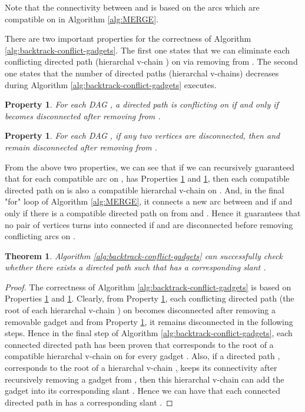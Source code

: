 \documentclass[11pt]{article}
\newtheorem{theorem}[figure]{Theorem}
\newtheorem{property}[figure]{Property}
\begin{document}
Note that the connectivity between  and  is based on the arcs
which are compatible on 
in Algorithm \ref{alg:MERGE}.


There are two important properties for the correctness of Algorithm \ref{alg:backtrack-conflict-gadgets}.
The first one states that
we can eliminate each conflicting directed path  (hierarchal v-chain ) on  via removing  from .
The second one states that
the number of directed paths (hierarchal v-chains) decreases
during Algorithm \ref{alg:backtrack-conflict-gadgets} executes.

\begin{property}\label{prop:connected-v-chain}
For each DAG ,
a directed path 
is conflicting on  if and only if  becomes disconnected after removing  from .
\end{property}

\begin{property}\label{prop:dummy-v-chain}
For each DAG ,
if any two vertices  are
disconnected, then  and  remain disconnected
after removing  from .
\end{property}

From the above two properties, we can see that
if we can recursively guaranteed that
for each compatible arc  on , 
has Properties \ref{prop:connected-v-chain} and \ref{prop:dummy-v-chain},
then each compatible directed path  on 
is also a compatible hierarchal v-chain on .
And, in the final "for" loop of Algorithm \ref{alg:MERGE},
it connects a new arc between  and 
if and only if there is a compatible directed path on  from  and .
Hence
it guarantees that no pair of vertices  turns into connected if
 and  are disconnected
before removing conflicting arcs on .

\begin{theorem}\label{thm:backtracking}
Algorithm \ref{alg:backtrack-conflict-gadgets} can successfully
check whether there exists a directed path 
such that  has a corresponding slant .
\end{theorem}

\begin{proof}

The correctness of Algorithm \ref{alg:backtrack-conflict-gadgets}
is based on Properties \ref{prop:connected-v-chain} and
\ref{prop:dummy-v-chain}.
Clearly, from Property \ref{prop:connected-v-chain},
each conflicting directed path 
(the root  of each hierarchal v-chain ) on 
becomes disconnected after removing a removable gadget 
and from Property \ref{prop:dummy-v-chain},
it remains disconnected in the following steps.
Hence in the final step of Algorithm \ref{alg:backtrack-conflict-gadgets},
each connected directed path  has been proven that
 corresponds to the root  of a compatible hierarchal v-chain on 
for every gadget .
Also,
if a directed path , corresponds to the root 
of a hierarchal v-chain , keeps its connectivity
after recursively removing a gadget  from , then
this hierarchal v-chain  can add the gadget  into its corresponding slant .
Hence we can have that each connected directed path in 
has a corresponding slant  .



\end{proof}
\end{document}
